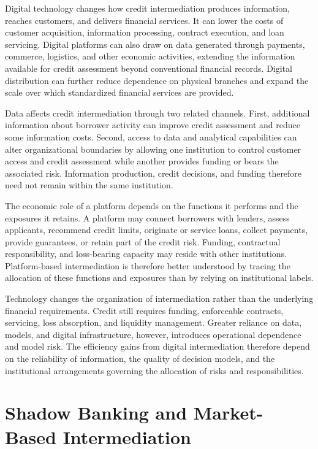 Digital technology changes how credit intermediation
produces information, reaches customers, and delivers
financial services. It can lower the costs of customer
acquisition, information processing, contract execution,
and loan servicing. Digital platforms can also draw on
data generated through payments, commerce, logistics,
and other economic activities, extending the information
available for credit assessment beyond conventional
financial records. Digital distribution can further
reduce dependence on physical branches and expand the
scale over which standardized financial services are
provided.

Data affects credit intermediation through two related
channels. First, additional information about borrower
activity can improve credit assessment and reduce some
information costs. Second, access to data and analytical
capabilities can alter organizational boundaries by
allowing one institution to control customer access
and credit assessment while another provides funding
or bears the associated risk. Information production,
credit decisions, and funding therefore need not remain
within the same institution.

The economic role of a platform depends on the functions
it performs and the exposures it retains. A platform may
connect borrowers with lenders, assess applicants,
recommend credit limits, originate or service loans,
collect payments, provide guarantees, or retain part
of the credit risk. Funding, contractual responsibility,
and loss-bearing capacity may reside with other
institutions. Platform-based intermediation is therefore
better understood by tracing the allocation of these
functions and exposures than by relying on institutional
labels.

Technology changes the organization of intermediation
rather than the underlying financial requirements.
Credit still requires funding, enforceable contracts,
servicing, loss absorption, and liquidity management.
Greater reliance on data, models, and digital
infrastructure, however, introduces operational
dependence and model risk. The efficiency gains from
digital intermediation therefore depend on the reliability
of information, the quality of decision models, and
the institutional arrangements governing the allocation
of risks and responsibilities.

\section{Shadow Banking and Market-Based Intermediation}

